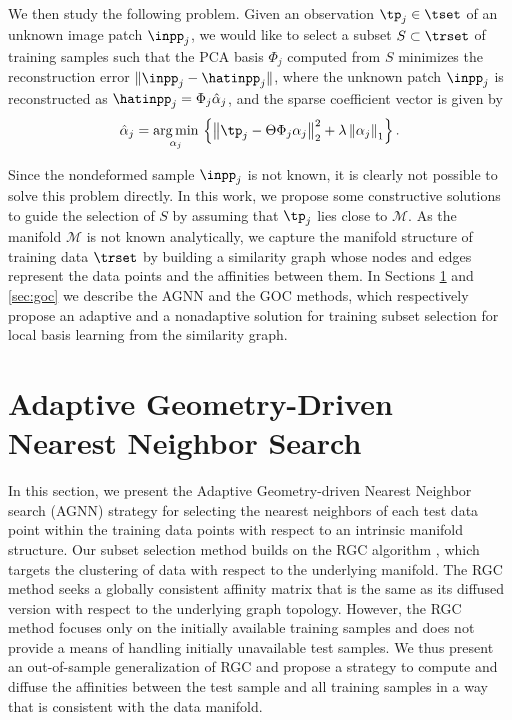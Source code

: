 \documentclass[journal]{IEEEtran}
\begin{document}
We then study the following problem. Given an observation $\tp_j \in \tset$ of an unknown image patch $\inpp_j$, we would like to select a subset $S \subset \trset$ of training samples such that the PCA basis $\Phi_j$ computed from $S $ minimizes the reconstruction error $\|  \inpp_j - \hatinpp_j \|$, where  the unknown patch $ \inpp_j$ is reconstructed as  $\hatinpp_j = \Phi_j \hat{\alpha}_j$, and  the sparse coefficient vector is given by
\begin{equation}
	\hat{\alpha}_j=\underset{\alpha_j}{\operatorname{arg\,min}} \, \left\{ \left\|  \tp_j -\Theta \Phi_j \alpha_j \right\|_{2}^{2} + \lambda \left\| \alpha_j \right\|_1\right\}.
\end{equation}




Since the nondeformed sample $\inpp_j$ is not known, it is clearly not possible to solve this problem directly. In this work, we propose some constructive solutions to guide the selection of  $S $ by assuming that $\tp_j$ lies close to $\mathcal{M}$. As the manifold $\mathcal{M}$ is not known analytically, we capture the manifold structure of training data $\trset$ by building a similarity graph whose nodes and edges represent the data points and the affinities between them. In Sections \ref{sec:agnn} and \ref{sec:goc} we describe the AGNN and the GOC methods, which respectively propose an adaptive and a nonadaptive solution for training subset selection for local basis learning from the similarity graph.





\section{Adaptive Geometry-Driven Nearest Neighbor Search}
\label{sec:agnn}


In this section, we present the Adaptive Geometry-driven Nearest Neighbor search (AGNN) strategy for selecting the nearest neighbors of each test data point within the training data points with respect to an intrinsic manifold structure. Our subset selection method builds on the RGC algorithm \cite{Donoser13replicator}, which targets the clustering of data with respect to the underlying manifold. The RGC method seeks a globally consistent affinity matrix that is the same as its diffused version with respect to the underlying graph topology. However, the RGC method focuses only on the initially available training samples and does not provide a means of handling initially unavailable test samples. We thus present an out-of-sample generalization of RGC and propose a strategy to compute and diffuse the affinities between the test sample and all training samples in a way that is consistent with the data manifold.
\end{document}
